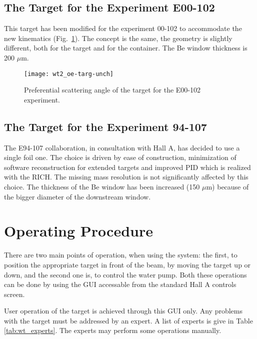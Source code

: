 {\subsection{The Target for the Experiment E00-102}

This target has been modified for the experiment 00-102 to accommodate
the new kinematics (Fig.~\ref{fig:wt_oee-kin}). The concept is the same,
the geometry is slightly different, both for the target and for the
container.%
The Be window thickness
is 200 $\mu $m.
\begin{figure}
\begin{center}\texttt{[image: wt2\_oe-targ-unch]}\end{center}
\caption{Preferential scattering angle of the target for the E00-102 experiment.}
\label{fig:wt_oee-kin}
\end{figure}



\subsection{The Target for the Experiment 94-107}

The E94-107 collaboration, in consultation with Hall A, has decided
to use a single foil one. The choice is driven by ease of construction,
minimization of software reconstruction for extended targets and improved
PID which is realized with the RICH. The missing mass resolution is
not significantly affected by this choice. The thickness of the Be
window has been increased (150 $\mu $m) because of the bigger diameter
of the downstream window.%

}


\section{Operating Procedure}
\label{sec:oper_proc}

 There are two main points of operation, when using the system: the
first, to position the appropriate target in front of the beam, by
moving the target up or down, and the second one is, to control the
water pump. Both these operations can be done by using the GUI%
%
%
 accessable from the standard Hall A controls screen.
\begin{safetyen}{20}{15}
User operation of the target is achieved through this GUI only.
Any problems with the target must be addressed by an expert. A list
of experts is give in Table \ref{tab:wt_experts}.
The experts may perform some operations manually.
\end{safetyen}

